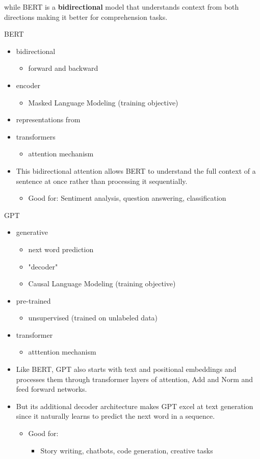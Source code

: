 \documentclass[11pt]{article}
\begin{document}
while BERT is a \textbf{\textbf{bidirectional}} model that understands context from
both directions making it better for comprehension tasks.

BERT
\begin{itemize}
\item bidirectional
\begin{itemize}
\item forward and backward
\end{itemize}
\item encoder
\begin{itemize}
\item Masked Language Modeling (training objective)
\end{itemize}
\item representations from
\item transformers
\begin{itemize}
\item attention mechanism
\end{itemize}
\item This bidirectional attention allows BERT to understand the full
context of a sentence at once rather than processing it
sequentially.
\begin{itemize}
\item Good for: Sentiment analysis, question answering, classification
\end{itemize}
\end{itemize}

GPT
\begin{itemize}
\item generative
\begin{itemize}
\item next word prediction
\item "decoder"
\item Causal Language Modeling (training objective)
\end{itemize}
\item pre-trained
\begin{itemize}
\item unsupervised (trained on unlabeled data)
\end{itemize}
\item transformer
\begin{itemize}
\item atttention mechanism
\end{itemize}
\item Like BERT, GPT also starts with text and positional embeddings and
processes them through transformer layers of attention, Add and Norm
and feed forward networks.
\item But its additional decoder architecture makes GPT excel at text
generation since it naturally learns to predict the next word in a
sequence.
\begin{itemize}
\item Good for:
\begin{itemize}
\item Story writing, chatbots, code generation, creative tasks
\end{itemize}
\end{itemize}
\end{itemize}
\end{document}
